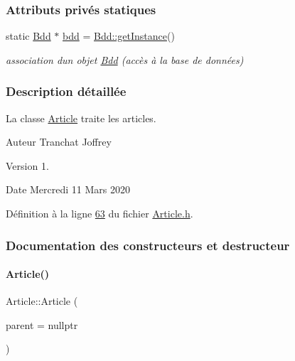 \subsubsection*{Attributs privés statiques}
\begin{DoxyCompactItemize}
\item 
static \hyperlink{class_bdd}{Bdd} $\ast$ \hyperlink{class_article_a7221cec4212d86d74f479b9ee683ee8a}{bdd} = \hyperlink{class_bdd_a6f55c29d593da12ca31fad02f5adfe24}{Bdd\+::get\+Instance}()
\begin{DoxyCompactList}\small\item\em association d\textquotesingle{}un objet \hyperlink{class_bdd}{Bdd} (accès à la base de données) \end{DoxyCompactList}\end{DoxyCompactItemize}


\subsubsection{Description détaillée}
La classe \hyperlink{class_article}{Article} traite les articles. 

\begin{DoxyAuthor}{Auteur}
Tranchat Joffrey
\end{DoxyAuthor}
\begin{DoxyVersion}{Version}
1.
\end{DoxyVersion}
\begin{DoxyDate}{Date}
Mercredi 11 Mars 2020 
\end{DoxyDate}


Définition à la ligne \hyperlink{_article_8h_source_l00063}{63} du fichier \hyperlink{_article_8h_source}{Article.\+h}.



\subsubsection{Documentation des constructeurs et destructeur}
\mbox{\label{class_article_a27b5b7af25138f7a465215be3a9deca4}} 
\paragraph{\texorpdfstring{Article()}{Article()}}
{\footnotesize\ttfamily Article\+::\+Article (\begin{DoxyParamCaption}\item[{\hyperlink{class_q_object}{Q\+Object} $\ast$}]{parent = {\ttfamily nullptr} }\end{DoxyParamCaption})}



